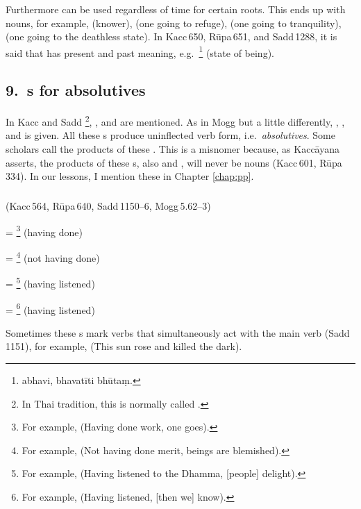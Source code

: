 Furthermore  can be used regardless of time for certain roots. This ends up with nouns, for example,  (knower),  (one going to refuge),  (one going to tranquility),  (one going to the deathless state). In Kacc\,650, R\=upa\,651, and Sadd\,1288, it is said that  has present and past meaning, e.g.\ \footnote{abhavi, bhavat\=iti bh\=uta\d m.} (state of being).

\subsection*{9.\ s for absolutives}\label{kita:group9}

In Kacc and Sadd \footnote{In Thai tradition, this is normally called .}, , and  are mentioned. As in Mogg but a little differently, , , and  is given. All these s produce uninflected verb form, i.e.\ \emph{absolutives}. Some scholars call the products of these . This is a misnomer because, as Kacc\=ayana asserts, the products of these s, also  and , will never be nouns (Kacc\,601, R\=upa\,334). In our lessons, I mention these in Chapter \ref{chap:pp}.

\subparagraph*{} (Kacc\,564, R\=upa\,640, Sadd\,1150--6, Mogg\,5.62--3)\label{pacck9:tuna}\label{pacck9:tuuna}\label{pacck9:tvaana}\label{pacck9:tvaa}\label{pacck9:ktvaana}\label{pacck9:ktvaa}

 = \footnote{For example,  (Having done work, one goes).} (having done)\par
{} = \footnote{For example,  (Not having done merit, beings are blemished).} (not having done)\par
{} = \footnote{For example,  (Having listened to the Dhamma, [people] delight).} (having listened)\par
{} = \footnote{For example,  (Having listened, [then we] know).} (having listened)\par

Sometimes these s mark verbs that simultaneously act with the main verb (Sadd\,1151), for example,  (This sun rose and killed the dark).

